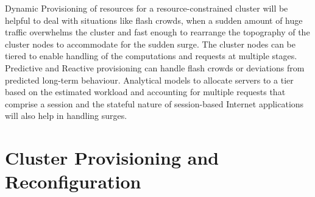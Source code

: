 \documentclass[conference]{IEEEtran}
\begin{document}
Dynamic Provisioning of resources \cite{dynamic} for a resource-constrained cluster will be helpful to deal with situations like flash crowds, when a sudden amount of huge traffic overwhelms the cluster and fast enough to rearrange the topography of the cluster nodes to accommodate for the sudden surge. The cluster nodes can be tiered to enable handling of the computations and requests at multiple stages. Predictive and Reactive provisioning \cite{daniel2011prediction} can handle flash crowds or deviations from predicted long-term behaviour. Analytical models to allocate servers to a tier based on the estimated workload and accounting for multiple requests that comprise a session and the stateful nature of session-based Internet applications will also help in handling surges.




\section{Cluster Provisioning and Reconfiguration}
\end{document}
